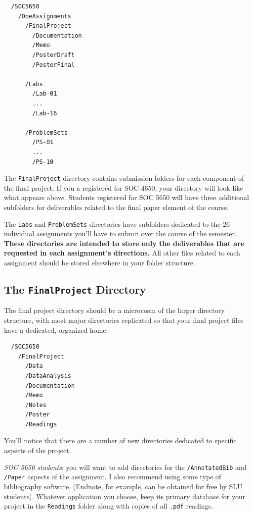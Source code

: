 \documentclass[]{book}
\begin{document}
\begin{verbatim}
  /SOC5650
    /DoeAssignments
      /FinalProject
        /Documentation
        /Memo
        /PosterDraft
        /PosterFinal
        
      /Labs
        /Lab-01
        ...
        /Lab-16
        
      /ProblemSets
        /PS-01
        ...
        /PS-10
\end{verbatim}

The \texttt{FinalProject} directory contains submission folders for each
component of the final project. If you a registered for SOC 4650, your
directory will look like what appears above. Students registered for SOC
5650 will have three additional subfolders for deliverables related to
the final paper element of the course.

The \texttt{Labs} and \texttt{ProblemSets} directories have subfolders
dedicated to the 26 individual assignments you'll have to submit over
the course of the semester. \textbf{These directories are intended to
store only the deliverables that are requested in each assignment's
directions.} All other files related to each assignment should be stored
elsewhere in your folder structure.

\subsection{\texorpdfstring{The \texttt{FinalProject}
Directory}{The FinalProject Directory}}\label{the-finalproject-directory}

The final project directory should be a microcosm of the larger
directory structure, with most major directories replicated so that your
final project files have a dedicated, organized home:

\begin{verbatim}
  /SOC5650
    /FinalProject
      /Data
      /DataAnalysis
      /Documentation
      /Memo
      /Notes
      /Poster
      /Readings
\end{verbatim}

You'll notice that there are a number of new directories dedicated to
specific aspects of the project.

\emph{SOC 5650 students}: you will want to add directories for the
\texttt{/AnnotatedBib} and \texttt{/Paper} aspects of the assignment. I
also recommend using some type of bibliography software.
(\href{http://endnote.com}{Endnote}, for example, can be obtained for
free by SLU students). Whatever application you choose, keep its primary
database for your project in the \texttt{Readings} folder along with
copies of all \texttt{.pdf} readings.
\end{document}
